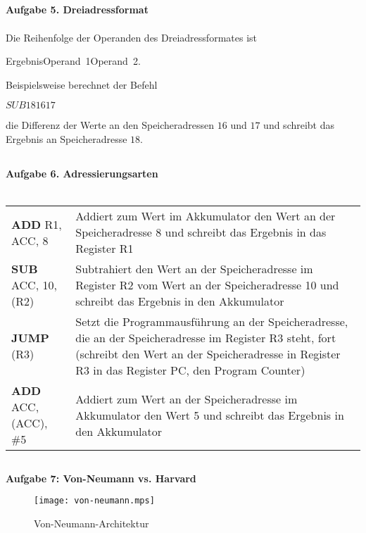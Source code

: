 \documentclass{article}
\begin{document}
\subsection*{}
\textbf{Aufgabe 5. Dreiadressformat} \\ \\
Die Reihenfolge der Operanden des Dreiadressformates ist
\begin{center}
Ergebnis\hspace{3mm}Operand~1\hspace{3mm}Operand~2.
\end{center}
Beispielsweise berechnet der Befehl
\begin{center}
$SUB$\hspace{3mm}$18$\hspace{3mm}$16$\hspace{3mm}$17$ \\
\end{center}
die Differenz der Werte an den Speicheradressen $16$ und $17$ und schreibt das Ergebnis an Speicheradresse $18$.

\subsection*{}
\textbf{Aufgabe 6. Adressierungsarten} \\ \\
{\renewcommand{\arraystretch}{1.5}
\begin{tabularx}{\linewidth}{l X}
\textbf{ADD} R1, ACC, 8 & Addiert zum Wert im Akkumulator den Wert an der Speicheradresse 8 und schreibt das Ergebnis
in das Register R1 \\
\textbf{SUB} ACC, 10, (R2) & Subtrahiert den Wert an der Speicheradresse im Re\-gister R2 vom Wert an der Speicheradresse 10 und schreibt das Ergebnis in den Akkumulator \\
\textbf{JUMP} (R3) & Setzt die Programmausführung an der Speicheradresse, die an der Speicheradresse im Register R3 steht, fort (schreibt den Wert an der Speicheradresse in Register R3 in das Register PC, den Program Counter) \\
\textbf{ADD} ACC, (ACC), \#5 & Addiert zum Wert an der Speicheradresse im Akkumulator den Wert 5 und schreibt das Ergebnis in den Akkumulator \\
\end{tabularx}
}

\pagebreak
\subsection*{}
\textbf{Aufgabe 7: Von-Neumann vs. Harvard} \\
\begin{figure}[h]
  \texttt{[image: von-neumann.mps]}
  \caption{Von-Neumann-Architektur}
\end{figure}
\end{document}
